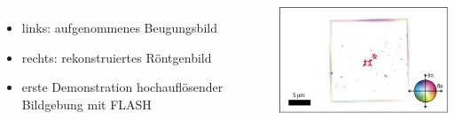 \documentclass[10pt,t]{beamer}
\begin{document}
\begin{frame}
\begin{columns}[c]
\begin{itemize}
    \item links: aufgenommenes Beugungsbild
    \item rechts: rekonstruiertes Röntgenbild
    \item erste Demonstration hochauflösender Bildgebung mit FLASH
\end{itemize}
\includegraphics[width=\textwidth]{flash-rekonstruiert}
\end{columns}
\vspace*{-3pt}
\end{frame}
\end{document}
